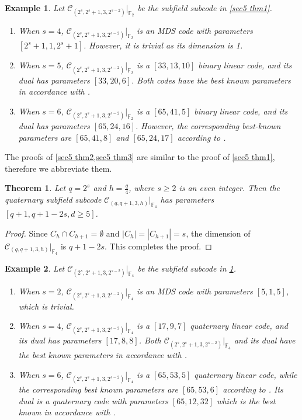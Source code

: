 \documentclass[sn-mathphys-num]{sn-jnl}%
\theoremstyle{thmstyleone}%
\newtheorem{theorem}{Theorem}%
\theoremstyle{thmstyletwo}%
\newtheorem{example}{Example}%
\theoremstyle{thmstylethree}%
\begin{document}
\begin{example}	
	Let $\mathcal{C}_{(2^s,2^s+1,3,2^{s-2})}|_{\mathbb{F}_{2}}$ be the subfield subcode in \cref{sec5 thm1}.
	\begin{enumerate}[label=\arabic*)]
		\item When $s=4$, $\mathcal{C}_{(2^s,2^s+1,3,2^{s-2})}|_{\mathbb{F}_{2}}$ is an MDS code with parameters $[2^s+1,1,2^s+1]$. However, it is trivial as its dimension is 1.
		\item When $s=5$, $\mathcal{C}_{(2^s,2^s+1,3,2^{s-2})}|_{\mathbb{F}_{2}}$ is a $[33,13,10]$ binary linear code, and its dual has parameters $[33,20,6]$. Both codes have the best known parameters in accordance with \cite{Grassl}.
		\item When $s=6$, $\mathcal{C}_{(2^s,2^s+1,3,2^{s-2})}|_{\mathbb{F}_{2}}$ is a $[65,41,5]$ binary linear code, and its dual has parameters $[65,24,16]$. However, the corresponding best-known parameters are $[65,41,8]$ and $[65,24,17]$ according to \cite{Grassl}.
	\end{enumerate}
\end{example}

The proofs of \cref{sec5 thm2,sec5 thm3} are similar to the proof of \cref{sec5 thm1}, therefore we abbreviate them. 

\begin{theorem}\label{sec5 thm2}
	Let $q=2^s$ and $h=\frac{q}{4}$, where $s\ge 2$ is an even integer. Then the quaternary subfield subcode $\mathcal{C}_{(q,q+1,3,h)}|_{\mathbb{F}_{4}}$ has parameters $[q+1,q+1-2s,d\ge5]$.
\end{theorem}
\begin{proof}
	Since $C_h \cap C_{h+1} =\emptyset$ and $|C_{h}|=|C_{h+1}|=s$, the dimension of $\mathcal{C}_{(q,q+1,3,h)}|_{\mathbb{F}_{4}}$ is $q+1-2s$.  This completes the proof.
\end{proof}

\begin{example}
	Let $\mathcal{C}_{(2^s,2^s+1,3,2^{s-2})}|_{\mathbb{F}_{4}}$ be the subfield subcode in \cref{sec5 thm2}.
	\begin{enumerate}[label=\arabic*)]
		\item When $s=2$, $\mathcal{C}_{(2^s,2^s+1,3,2^{s-2})}|_{\mathbb{F}_{4}}$ is an MDS code with parameters $[5,1,5]$, which is trivial.
		\item When $s=4$, $\mathcal{C}_{(2^s,2^s+1,3,2^{s-2})}|_{\mathbb{F}_{4}}$ is a $[17,9,7]$ quaternary linear code, and its dual has parameters $[17,8,8]$. Both $\mathcal{C}_{(2^s,2^s+1,3,2^{s-2})}|_{\mathbb{F}_{4}}$ and its dual have the best known parameters in accordance with \cite{Grassl}.
		\item When $s=6$, $\mathcal{C}_{(2^s,2^s+1,3,2^{s-2})}|_{\mathbb{F}_{4}}$ is a $[65,53,5]$ quaternary linear code, while the corresponding best known parameters are $[65,53,6]$ according to \cite{Grassl}. Its dual is a quaternary code with parameters $[65,12,32]$ which is the best known in accordance with \cite{Grassl}.
	\end{enumerate}
\end{example}
\end{document}
